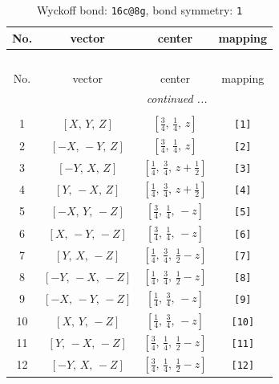 \documentclass[fleqn,8pt]{jsarticle}
\begin{document}
\begin{longtable}{cccc}
\caption{Wyckoff bond: {\tt 16c@8g}, bond symmetry: {\tt 1}}
 \\
 \hline \hline
No. & vector & center & mapping \\ \hline \endfirsthead

\multicolumn{3}{l}{\tablename\ \thetable{}} \\
 \hline \hline
No. & vector & center & mapping \\ \hline \endhead

 \hline \hline
\multicolumn{3}{r}{\footnotesize\it continued ...} \\ \endfoot

 \hline \hline
\multicolumn{3}{r}{} \\ \endlastfoot

1 & $\left[ X,\, Y,\, Z \right]$ & $\left[ \frac{3}{4},\, \frac{1}{4},\, z \right]$ & {\tt [1]} \\ \hline
2 & $\left[ - X,\, - Y,\, Z \right]$ & $\left[ \frac{3}{4},\, \frac{1}{4},\, z \right]$ & {\tt [2]} \\ \hline
3 & $\left[ - Y,\, X,\, Z \right]$ & $\left[ \frac{1}{4},\, \frac{3}{4},\, z + \frac{1}{2} \right]$ & {\tt [3]} \\ \hline
4 & $\left[ Y,\, - X,\, Z \right]$ & $\left[ \frac{1}{4},\, \frac{3}{4},\, z + \frac{1}{2} \right]$ & {\tt [4]} \\ \hline
5 & $\left[ - X,\, Y,\, - Z \right]$ & $\left[ \frac{3}{4},\, \frac{1}{4},\, - z \right]$ & {\tt [5]} \\ \hline
6 & $\left[ X,\, - Y,\, - Z \right]$ & $\left[ \frac{3}{4},\, \frac{1}{4},\, - z \right]$ & {\tt [6]} \\ \hline
7 & $\left[ Y,\, X,\, - Z \right]$ & $\left[ \frac{1}{4},\, \frac{3}{4},\, \frac{1}{2} - z \right]$ & {\tt [7]} \\ \hline
8 & $\left[ - Y,\, - X,\, - Z \right]$ & $\left[ \frac{1}{4},\, \frac{3}{4},\, \frac{1}{2} - z \right]$ & {\tt [8]} \\ \hline
9 & $\left[ - X,\, - Y,\, - Z \right]$ & $\left[ \frac{1}{4},\, \frac{3}{4},\, - z \right]$ & {\tt [9]} \\ \hline
10 & $\left[ X,\, Y,\, - Z \right]$ & $\left[ \frac{1}{4},\, \frac{3}{4},\, - z \right]$ & {\tt [10]} \\ \hline
11 & $\left[ Y,\, - X,\, - Z \right]$ & $\left[ \frac{3}{4},\, \frac{1}{4},\, \frac{1}{2} - z \right]$ & {\tt [11]} \\ \hline
12 & $\left[ - Y,\, X,\, - Z \right]$ & $\left[ \frac{3}{4},\, \frac{1}{4},\, \frac{1}{2} - z \right]$ & {\tt [12]} \\ \hline

\end{longtable}
\end{document}
